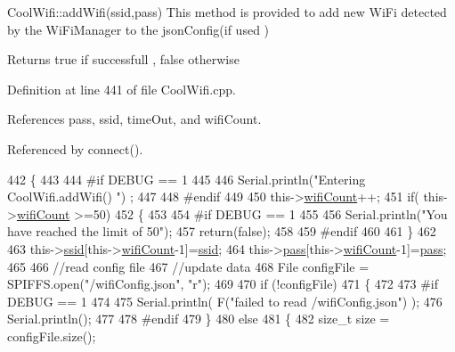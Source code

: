 Cool\+Wifi\+::add\+Wifi(ssid,pass) This method is provided to add new Wi\+Fi detected by the Wi\+Fi\+Manager to the json\+Config(if used )

\begin{DoxyReturn}{Returns}
true if successfull , false otherwise 
\end{DoxyReturn}


Definition at line 441 of file Cool\+Wifi.\+cpp.



References pass, ssid, time\+Out, and wifi\+Count.



Referenced by connect().


\begin{DoxyCode}
442 \{
443 
444 \textcolor{preprocessor}{#if DEBUG == 1}
445     
446     Serial.println(\textcolor{stringliteral}{"Entering CoolWifi.addWifi() "}) ;
447 
448 \textcolor{preprocessor}{#endif  }
449     
450     this->\hyperlink{classCoolWifi_ab133bd92fcb895b884deecd6678592e4}{wifiCount}++;
451     \textcolor{keywordflow}{if}( this->\hyperlink{classCoolWifi_ab133bd92fcb895b884deecd6678592e4}{wifiCount} >=50)
452     \{
453     
454 \textcolor{preprocessor}{    #if DEBUG == 1}
455 
456         Serial.println(\textcolor{stringliteral}{"You have reached the limit of 50"});
457         \textcolor{keywordflow}{return}(\textcolor{keyword}{false});  
458     
459 \textcolor{preprocessor}{    #endif}
460 
461     \}
462 
463     this->\hyperlink{classCoolWifi_a893b21d0fed821438733bba2e73fb4c2}{ssid}[this->\hyperlink{classCoolWifi_ab133bd92fcb895b884deecd6678592e4}{wifiCount}-1]=\hyperlink{classCoolWifi_a893b21d0fed821438733bba2e73fb4c2}{ssid};
464     this->\hyperlink{classCoolWifi_a0c3332a149245aaad060b32593a54c9b}{pass}[this->\hyperlink{classCoolWifi_ab133bd92fcb895b884deecd6678592e4}{wifiCount}-1]=\hyperlink{classCoolWifi_a0c3332a149245aaad060b32593a54c9b}{pass};
465     
466     \textcolor{comment}{//read config file}
467     \textcolor{comment}{//update data}
468     File configFile = SPIFFS.open(\textcolor{stringliteral}{"/wifiConfig.json"}, \textcolor{stringliteral}{"r"});
469 
470     \textcolor{keywordflow}{if} (!configFile) 
471     \{
472     
473 \textcolor{preprocessor}{    #if DEBUG == 1 }
474 
475         Serial.println( F(\textcolor{stringliteral}{"failed to read /wifiConfig.json"}) );
476         Serial.println();
477 
478 \textcolor{preprocessor}{    #endif}
479     \}
480     \textcolor{keywordflow}{else}
481     \{
482         \textcolor{keywordtype}{size\_t} size = configFile.size();

\end{DoxyCode}
